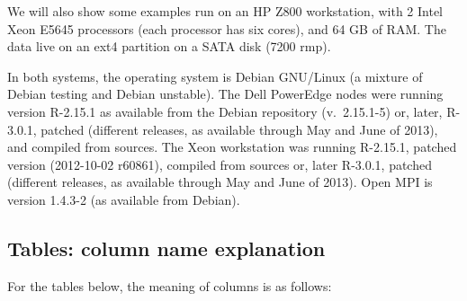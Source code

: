 \documentclass[a4paper,11pt]{article}
\begin{document}
  
We will also show some examples run on an HP Z800 workstation, with 2
Intel Xeon E5645 processors (each processor has six cores), and 64 GB of
RAM. The data live on an ext4 partition on a SATA disk (7200 rmp). %


In both systems, the operating system is Debian GNU/Linux (a mixture of
Debian testing and Debian unstable). The Dell PowerEdge nodes were running
version R-2.15.1 as available from the Debian repository (v.\ 2.15.1-5)
or, later, R-3.0.1, patched (different releases, as available through May
and June of 2013), and compiled from sources. The Xeon workstation was
running R-2.15.1, patched version (2012-10-02 r60861), compiled from
sources or, later R-3.0.1, patched (different releases, as available
through May and June of 2013). Open MPI is version 1.4.3-2 (as available
from Debian).


\subsection{Tables: column name explanation}
For the tables below, the meaning of columns is as follows:
\end{document}
